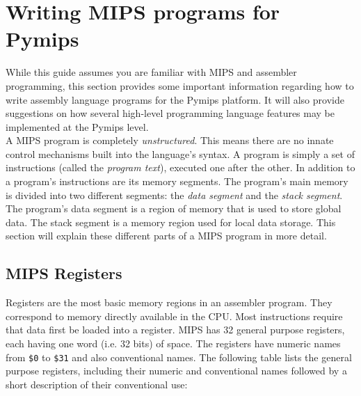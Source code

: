 \documentclass[12pt]{article}
\begin{document}
\newpage
\section{Writing MIPS programs for Pymips}

While this guide assumes you are familiar with MIPS and assembler programming,
     this section provides some important information regarding how to write
     assembly language programs for the Pymips platform. It will also provide
     suggestions on how several high-level programming language features may be
     implemented at the Pymips level.\\

A MIPS program is completely \textit{unstructured}. This means there are no
     innate control mechanisms built into the language's syntax. A program is
     simply a set of instructions (called the \textit{program text}), executed
     one after the other. In addition to a program's instructions are its memory
     segments. The program's main memory is divided into two different segments:
     the \textit{data segment} and the \textit{stack segment}. The program's
     data segment is a region of memory that is used to store global data. The
     stack segment is a memory region used for local data storage. This section
     will explain these different parts of a MIPS program in more detail.

\subsection{MIPS Registers}

Registers are the most basic memory regions in an assembler program. They
     correspond to memory directly available in the CPU. Most instructions
     require that data first be loaded into a register. MIPS has 32 general
     purpose registers, each having one word (i.e. 32 bits) of space. The
     registers have numeric names from \texttt{\$0} to \texttt{\$31} and also
     conventional names. The following table lists the general purpose
     registers, including their numeric and conventional names followed by a
     short description of their conventional use:\\
\end{document}
